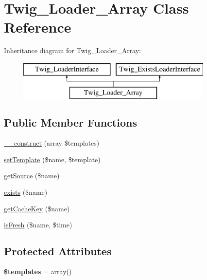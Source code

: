 \hypertarget{classTwig__Loader__Array}{}\section{Twig\+\_\+\+Loader\+\_\+\+Array Class Reference}
\label{classTwig__Loader__Array}
Inheritance diagram for Twig\+\_\+\+Loader\+\_\+\+Array\+:\begin{figure}[H]
\begin{center}
\leavevmode
\includegraphics[height=2.000000cm]{classTwig__Loader__Array}
\end{center}
\end{figure}
\subsection*{Public Member Functions}
\begin{DoxyCompactItemize}
\item 
\hyperlink{classTwig__Loader__Array_a237a397f1351fe8f39b8221e64e88b38}{\+\_\+\+\_\+construct} (array \$templates)
\item 
\hyperlink{classTwig__Loader__Array_aa7815379d9bfdf46b52656e9469d1740}{set\+Template} (\$name, \$template)
\item 
\hyperlink{classTwig__Loader__Array_ac8d92f8267eda7414d886e3bebbbe097}{get\+Source} (\$name)
\item 
\hyperlink{classTwig__Loader__Array_aac1b01dde786b750097afbf21b167a38}{exists} (\$name)
\item 
\hyperlink{classTwig__Loader__Array_ade092fc47792d56a2ae798fa70adb4d6}{get\+Cache\+Key} (\$name)
\item 
\hyperlink{classTwig__Loader__Array_a043e7a37258cc0c7a862de0aabeff01b}{is\+Fresh} (\$name, \$time)
\end{DoxyCompactItemize}
\subsection*{Protected Attributes}
\begin{DoxyCompactItemize}
\item 
{\bfseries \$templates} = array()\hypertarget{classTwig__Loader__Array_a661ad5a4fa684c657e94a6411fa45d7e}{}\label{classTwig__Loader__Array_a661ad5a4fa684c657e94a6411fa45d7e}

\end{DoxyCompactItemize}


